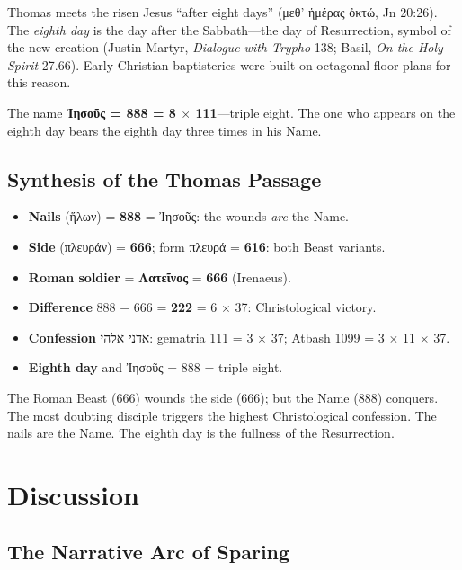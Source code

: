\documentclass[12pt,a4paper]{article}
\begin{document}
Thomas meets the risen Jesus ``after eight days'' (μεθ' ἡμέρας ὀκτώ, Jn 20:26). The \textit{eighth day} is the day after the Sabbath---the day of Resurrection, symbol of the new creation (Justin Martyr, \textit{Dialogue with Trypho} 138; Basil, \textit{On the Holy Spirit} 27.66). Early Christian baptisteries were built on octagonal floor plans for this reason.

The name \textbf{Ἰησοῦς = 888 = 8 $\times$ 111}---triple eight. The one who appears on the eighth day bears the eighth day three times in his Name.

\subsection{Synthesis of the Thomas Passage}

\begin{itemize}
    \item \textbf{Nails} (ἥλων) = \textbf{888} = Ἰησοῦς: the wounds \textit{are} the Name.
    \item \textbf{Side} (πλευράν) = \textbf{666}; form πλευρά = \textbf{616}: both Beast variants.
    \item \textbf{Roman soldier} = \textbf{Λατεῖνος} = \textbf{666} (Irenaeus).
    \item \textbf{Difference} 888 − 666 = \textbf{222} = 6 $\times$ 37: Christological victory.
    \item \textbf{Confession} אדני אלהי: gematria 111 = 3 $\times$ 37; Atbash 1099 = 3 $\times$ 11 $\times$ 37.
    \item \textbf{Eighth day} and Ἰησοῦς = 888 = triple eight.
\end{itemize}

The Roman Beast (666) wounds the side (666); but the Name (888) conquers. The most doubting disciple triggers the highest Christological confession. The nails are the Name. The eighth day is the fullness of the Resurrection.

\section{Discussion}
\label{sec:discussion}

\subsection{The Narrative Arc of Sparing}
\end{document}
